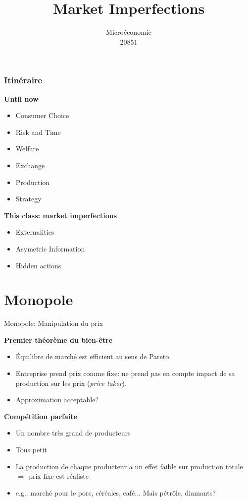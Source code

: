 \documentclass[handout]{beamer}
\title{Market Imperfections}
\author{Microéconomie \\ 20851}
\date{}
\newenvironment{iPar}[1]{\textbf{#1} \begin{itemize}}{\end{itemize}}
\newcommand{\mdp}{\medskip \pause}
\begin{document}
\frame{\titlepage}

\begin{frame}\frametitle{Itinéraire}

\begin{iPar}{Until now}
\item Consumer Choice
\item Risk and Time
\item Welfare
\item Exchange
\item Production
\item Strategy
\end{iPar}\mdp

\begin{iPar}{This class: market imperfections}
\item Externalities
\item Asymetric Information
\item Hidden actions

\end{iPar}\mdp


\end{frame}

\section[Outline]{}
\frame{\tableofcontents}

\section{Monopole}

\begin{frame}{Monopole: Manipulation du prix}

\begin{iPar}{Premier théorème du bien-être} \item Équilibre de marché est efficient au sens de Pareto \item Entreprise prend prix comme fixe: ne prend pas en compte impact de sa production sur les prix (\textit{price taker}).
\item Approximation acceptable? \end{iPar} \mdp

\begin{iPar}{Compétition parfaite} \item Un nombre très grand de producteurs \item
Tous petit \item La production de chaque producteur a un effet faible sur production totale $\Rightarrow$ prix fixe est réaliste \item e.g.: marché pour le porc, céréales, café... Mais pétrôle, diamants? \end{iPar}

\end{frame}
\end{document}
